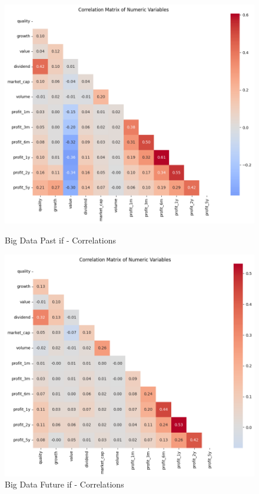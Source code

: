 \documentclass[11pt,english,a4paper,hidelinks]{book}
\begin{document}
\begin{figure}[H]
    \centering
    \begin{minipage}{0.48\textwidth}
        \centering
        \includegraphics[width=\linewidth]{images/code/descriptive analysis/correlations/Big Data Past - IF.png}
        \caption{Big Data Past \acrshort{if} - Correlations}
        \label{fig:big_data_past_if_correlations}
    \end{minipage}\hfill
    \begin{minipage}{0.48\textwidth}
        \centering
        \includegraphics[width=\linewidth]{images/code/descriptive analysis/correlations/Big Data future - IF.png}
        \caption{Big Data Future \acrshort{if} - Correlations}
        \label{fig:big_data_future_if_correlations}
    \end{minipage}
\end{figure}
\end{document}
